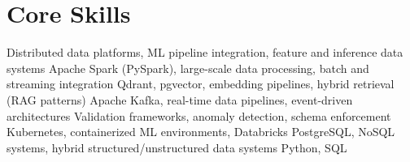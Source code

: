 \section*{Core Skills}
\vspace{-0.15em}

 {Distributed data platforms, ML pipeline integration, feature and inference data systems}
 {Apache Spark (PySpark), large-scale data processing, batch and streaming integration }
 {Qdrant, pgvector, embedding pipelines, hybrid retrieval (RAG patterns)}
 {Apache Kafka, real-time data pipelines, event-driven architectures }
 {Validation frameworks, anomaly detection, schema enforcement}
 {Kubernetes, containerized ML environments, Databricks}
 {PostgreSQL, NoSQL systems, hybrid structured/unstructured data systems}
 {Python, SQL }